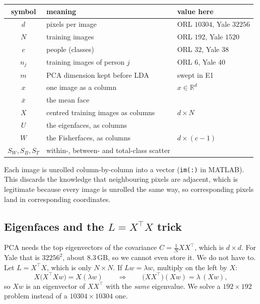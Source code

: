 \documentclass[11pt]{article}
\theoremstyle{remark}
\newcommand{\Sw}{S_W}
\newcommand{\Sb}{S_B}
\newcommand{\St}{S_T}
\begin{document}
\begin{center}
\small
\begin{tabular}{cll}
\toprule
symbol & meaning & value here \\
\midrule
$d$        & pixels per image               & ORL $10304$, Yale $32256$ \\
$N$        & training images                & ORL $192$, Yale $1520$ \\
$c$        & people (classes)               & ORL $32$, Yale $38$ \\
$n_j$      & training images of person $j$  & ORL $6$, Yale $40$ \\
$m$        & PCA dimension kept before LDA  & swept in E1 \\
$x$        & one image as a column          & $x\in\mathbb{R}^d$ \\
$\bar{x}$  & the mean face                  & \\
$X$        & centred training images as columns & $d\times N$ \\
$U$        & the eigenfaces, as columns     & \\
$W$        & the Fisherfaces, as columns    & $d\times(c-1)$ \\
$\Sw,\Sb,\St$ & within-, between- and total-class scatter & \\
\bottomrule
\end{tabular}
\end{center}

Each image is unrolled column-by-column into a vector (\texttt{im(:)} in
MATLAB). This discards the knowledge that neighbouring pixels are adjacent,
which is legitimate because every image is unrolled the same way, so
corresponding pixels land in corresponding coordinates.

\subsection{Eigenfaces and the \texorpdfstring{$L = X^{\!\top}\!X$}{L = X'X} trick}

PCA needs the top eigenvectors of the covariance $C = \tfrac1N XX^{\!\top}$,
which is $d\times d$. For Yale that is $32256^2$, about $8.3$\,GB, so we cannot
even store it. We do not have to. Let $L = X^{\!\top}\!X$, which is only
$N\times N$. If $Lw = \lambda w$, multiply on the left by $X$:
\[
  X\big(X^{\!\top}\!Xw\big) = X(\lambda w)
  \qquad\Longrightarrow\qquad
  \big(XX^{\!\top}\big)(Xw) = \lambda\,(Xw),
\]
so $Xw$ is an eigenvector of $XX^{\!\top}$ with the \emph{same} eigenvalue. We
solve a $192\times192$ problem instead of a $10304\times10304$ one.
\end{document}
